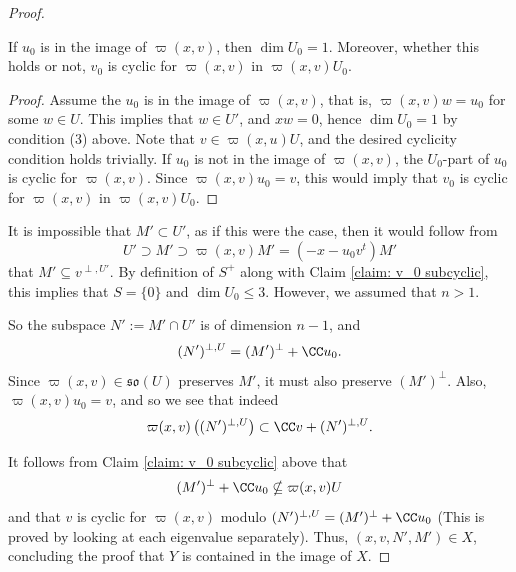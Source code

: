 \documentclass[11pt]{article}
\begin{document}
\begin{proof}
    \begin{claim}\label{claim: v_0 subcyclic}
        If $u_0$ is in the image of $\varpi(x, v)$, then $\dim U_0 = 1$. Moreover, whether this holds or not, $v_0$ is cyclic for $\varpi(x, v)$ in $\varpi(x, v)U_0$.
    \end{claim}
    \begin{proof}
        Assume the $u_0$ is in the image of $\varpi(x, v)$, that is, $\varpi(x,v)w = u_0$ for some $w\in U$. This implies that $w\in U'$, and $xw=0$, hence $\dim U_0 = 1$ by condition (3) above. Note that $v\in \varpi(x,u)U$, and the desired cyclicity condition holds trivially.
        If $u_0$ is not in the image of $\varpi(x, v)$, the $U_0$-part of $u_0$ is cyclic for $\varpi(x, v)$. Since $\varpi(x, v)u_0 = v$, this would imply that $v_0$ is cyclic for $\varpi(x, v)$ in $\varpi(x, v)U_0$.
    \end{proof}

    It is impossible that $M'\subset U'$, as if this were the case, then it would follow from $$U'\supset M'\supset\varpi(x,v)M'=(-x-u_0v^t)M'$$ that $M'\subseteq v^{\perp, U'}$. By definition of $S^+$ along with Claim \ref{claim: v_0 subcyclic}, this implies that $S = \{0\}$ and $\dim U_0 \leq 3$. However, we assumed that $n>1$.

    So the subspace $N':= M'\cap U'$ is of dimension $n-1$, and
    $$(N')^{\perp, U} = (M')^\perp + \CC u_0.$$
    Since $\varpi(x,v)\in \mathfrak{so}(U)$ preserves $M'$, it must also preserve $(M')^\perp$. Also, $\varpi(x, v)u_0 = v$, and so we see that indeed $$\varpi(x, v)\left((N')^{\perp, U}\right)\subset \CC v + (N')^{\perp, U}.$$

    It follows from Claim \ref{claim: v_0 subcyclic} above that
    $$(M')^\perp + \CC u_0\nsubseteq \varpi(x,v)U$$
    and that $v$ is cyclic for $\varpi(x, v)$ modulo $(N')^{\perp, U} = (M')^\perp + \CC u_0$ (This is proved by looking at each eigenvalue separately).
    Thus, $(x, v, N', M')\in X$, concluding the proof that $Y$ is contained in the image of $X$.
    

\end{proof}
\end{document}
